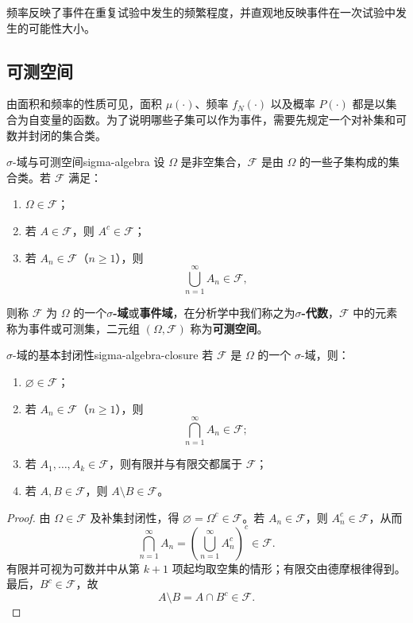 频率反映了事件在重复试验中发生的频繁程度，并直观地反映事件在一次试验中发生的可能性大小。

\subsection*{可测空间}

由面积和频率的性质可见，面积 $\mu(\cdot)$、频率 $f_N(\cdot)$ 以及概率 $P(\cdot)$ 都是以集合为自变量的函数。为了说明哪些子集可以作为事件，需要先规定一个对补集和可数并封闭的集合类。

\begin{mydefinition}{$\sigma$-域与可测空间}{sigma-algebra}
设 $\Omega$ 是非空集合，$\mathscr{F}$ 是由 $\Omega$ 的一些子集构成的集合类。若 $\mathscr{F}$ 满足：
\begin{enumerate}
\item $\Omega\in\mathscr{F}$；
\item 若 $A\in\mathscr{F}$，则 $A^c\in\mathscr{F}$；
\item 若 $A_n\in\mathscr{F}$（$n\geq1$），则
\[
\bigcup_{n=1}^{\infty}A_n\in\mathscr{F},
\]
\end{enumerate}
则称 $\mathscr{F}$ 为 $\Omega$ 的一个\textbf{$\sigma$-域}或\textbf{事件域}，在分析学中我们称之为\textbf{$\sigma$-代数}，$\mathscr{F}$ 中的元素称为事件或可测集，二元组 $(\Omega,\mathscr{F})$ 称为\textbf{可测空间}。
\end{mydefinition}

\begin{proposition}{$\sigma$-域的基本封闭性}{sigma-algebra-closure}
若 $\mathscr{F}$ 是 $\Omega$ 的一个 $\sigma$-域，则：
\begin{enumerate}
\item $\varnothing\in\mathscr{F}$；
\item 若 $A_n\in\mathscr{F}$（$n\geq1$），则
\[
\bigcap_{n=1}^{\infty}A_n\in\mathscr{F};
\]
\item 若 $A_1,\ldots,A_k\in\mathscr{F}$，则有限并与有限交都属于 $\mathscr{F}$；
\item 若 $A,B\in\mathscr{F}$，则 $A\setminus B\in\mathscr{F}$。
\end{enumerate}
\end{proposition}

\begin{proof}
由 $\Omega\in\mathscr{F}$ 及补集封闭性，得 $\varnothing=\Omega^c\in\mathscr{F}$。若 $A_n\in\mathscr{F}$，则 $A_n^c\in\mathscr{F}$，从而
\[
\bigcap_{n=1}^{\infty}A_n
=\left(\bigcup_{n=1}^{\infty}A_n^c\right)^c
\in\mathscr{F}.
\]
有限并可视为可数并中从第 $k+1$ 项起均取空集的情形；有限交由德摩根律得到。最后，$B^c\in\mathscr{F}$，故
\[
A\setminus B=A\cap B^c\in\mathscr{F}.
\]
\end{proof}


